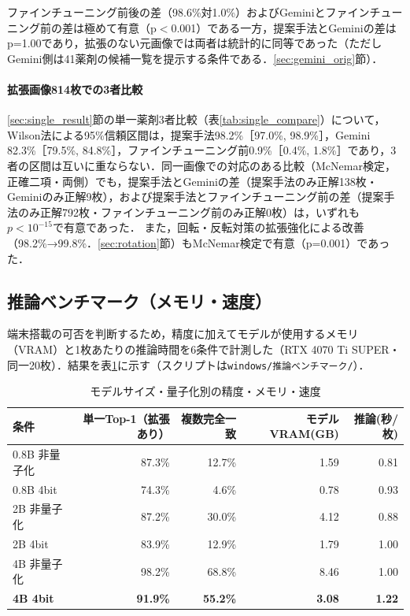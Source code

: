 \documentclass[dvipdfmx]{jsarticle}
\begin{document}
ファインチューニング前後の差（98.6\%対1.0\%）およびGeminiとファインチューニング前の差は極めて有意（p$<$0.001）である一方，提案手法とGeminiの差はp=1.00であり，拡張のない元画像では両者は統計的に同等であった（ただしGemini側は41薬剤の候補一覧を提示する条件である．\ref{sec:gemini_orig}節）．

\paragraph{拡張画像814枚での3者比較}
\ref{sec:single_result}節の単一薬剤3者比較（表\ref{tab:single_compare}）について，Wilson法による95\%信頼区間は，提案手法98.2\%［97.0\%, 98.9\%］，Gemini 82.3\%［79.5\%, 84.8\%］，ファインチューニング前0.9\%［0.4\%, 1.8\%］であり，3者の区間は互いに重ならない．同一画像での対応のある比較（McNemar検定，正確二項・両側）でも，提案手法とGeminiの差（提案手法のみ正解138枚・Geminiのみ正解9枚），および提案手法とファインチューニング前の差（提案手法のみ正解792枚・ファインチューニング前のみ正解0枚）は，いずれも$p<10^{-15}$で有意であった．
また，回転・反転対策の拡張強化による改善（98.2\%→99.8\%．\ref{sec:rotation}節）もMcNemar検定で有意（p=0.001）であった．

\subsection{推論ベンチマーク（メモリ・速度）}\label{sec:bench}

端末搭載の可否を判断するため，精度に加えてモデルが使用するメモリ（VRAM）と1枚あたりの推論時間を6条件で計測した（RTX 4070 Ti SUPER・同一20枚）．結果を表\ref{tab:bench}に示す（スクリプトは\texttt{windows/推論ベンチマーク/}）．

\begin{table}[htbp]
\centering
\caption{モデルサイズ・量子化別の精度・メモリ・速度}
\label{tab:bench}
\small
\begin{tabular}{lrrrr}
\hline
条件 & 単一Top-1（拡張あり） & 複数完全一致 & モデルVRAM(GB) & 推論(秒/枚) \\
\hline
0.8B 非量子化 & 87.3\% & 12.7\% & 1.59 & 0.81 \\
0.8B 4bit & 74.3\% & 4.6\% & 0.78 & 0.93 \\
2B 非量子化 & 87.2\% & 30.0\% & 4.12 & 0.88 \\
2B 4bit & 83.9\% & 12.9\% & 1.79 & 1.00 \\
4B 非量子化 & 98.2\% & 68.8\% & 8.46 & 1.00 \\
\textbf{4B 4bit} & \textbf{91.9\%} & \textbf{55.2\%} & \textbf{3.08} & \textbf{1.22} \\
\hline
\end{tabular}
\end{table}
\end{document}
